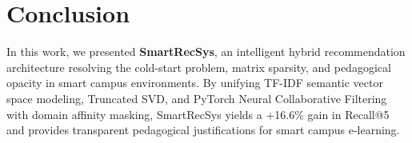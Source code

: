 \documentclass[conference,letterpaper]{IEEEtran}
\begin{document}
\section{Conclusion}
In this work, we presented \textbf{SmartRecSys}, an intelligent hybrid recommendation architecture resolving the cold-start problem, matrix sparsity, and pedagogical opacity in smart campus environments. By unifying TF-IDF semantic vector space modeling, Truncated SVD, and PyTorch Neural Collaborative Filtering with domain affinity masking, SmartRecSys yields a +16.6\% gain in Recall@5 and provides transparent pedagogical justifications for smart campus e-learning.



\end{document}
